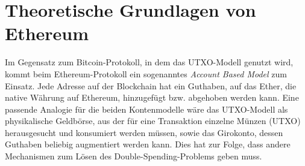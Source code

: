 \section{Theoretische Grundlagen von Ethereum}
Im Gegensatz zum Bitcoin-Protokoll, in dem das UTXO-Modell genutzt wird, kommt beim Ethereum-Protokoll ein sogenanntes \emph{Account Based Model} zum Einsatz. Jede Adresse auf der Blockchain hat ein Guthaben, auf das Ether, die native Währung auf Ethereum, hinzugefügt bzw. abgehoben werden kann. Eine passende Analogie für die beiden Kontenmodelle wäre das UTXO-Modell als physikalische Geldbörse, aus der für eine Transaktion einzelne Münzen (UTXO) herausgesucht und konsumiert werden müssen, sowie das Girokonto, dessen Guthaben beliebig augmentiert werden kann. Dies hat zur Folge, dass andere Mechanismen zum Lösen des Double-Spending-Problems geben muss.

